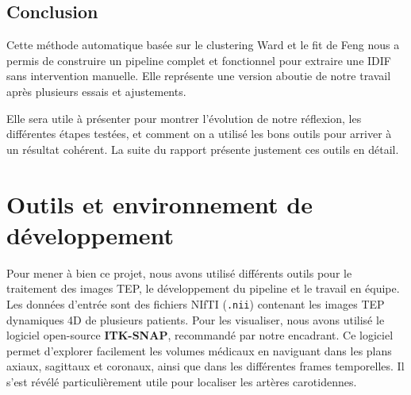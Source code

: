 \documentclass[a4paper]{article}
\begin{document}
    \subsection*{Conclusion}

        \noindent
            Cette méthode automatique basée sur le clustering Ward et le fit de Feng nous a permis de construire un pipeline complet et fonctionnel pour extraire une IDIF sans intervention manuelle. Elle représente une version aboutie de notre travail après plusieurs essais et ajustements.
        
        \noindent
            Elle sera utile à présenter pour montrer l’évolution de notre réflexion, les différentes étapes testées, et comment on a utilisé les bons outils pour arriver à un résultat cohérent. La suite du rapport présente justement ces outils en détail.

        
                
            
        

    \newpage
    \section{Outils et environnement de développement}
    \label{sec:Outils}
    \noindent
        Pour mener à bien ce projet, nous avons utilisé différents outils pour le traitement des images TEP, le développement du pipeline et le travail en équipe.\\
    
        \noindent
        Les données d’entrée sont des fichiers NIfTI (\texttt{.nii}) contenant les images TEP dynamiques 4D de plusieurs patients. Pour les visualiser, nous avons utilisé le logiciel open-source \textbf{ITK-SNAP}, recommandé par notre encadrant. Ce logiciel permet d’explorer facilement les volumes médicaux en naviguant dans les plans axiaux, sagittaux et coronaux, ainsi que dans les différentes frames temporelles. Il s’est révélé particulièrement utile pour localiser les artères carotidennes.\\
        
\end{document}
